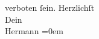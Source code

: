 \begin{ledgroupsized}[t]{13cm}
               verboten ſein.\pend
           \pstart
           Herzlichſt{\\[\baselineskip]}Dein{\\[\baselineskip]}\spacefill\mbox{Hermann}\pend
           \leftskip=0em{}          \endnumbering{}\end{ledgroupsized}  \newcommand{\dateiname}{L01184}\newcommand{\titel}{Hermann Bahr an Arthur Schnitzler, 27. 10. [1901]}\newcommand{\editorInnen}{ Kurt Ifkovits,  Martin Anton Müller}
            \footnotesize
\begin{ledgroupsized}[t]{11.5cm}
\end{ledgroupsized}
         
      